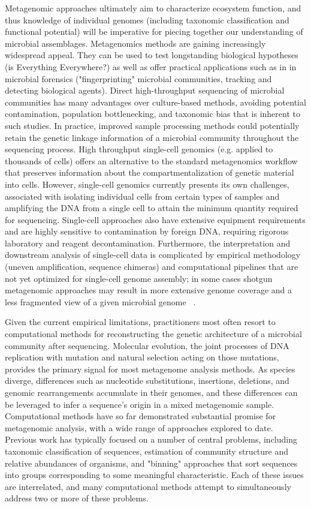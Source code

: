 \documentclass[10pt]{article}
\begin{document}
Metagenomic approaches ultimately aim to characterize ecosystem function, and thus knowledge of individual genomes (including taxonomic classification and functional potential) will be imperative for piecing together our understanding of microbial assemblages.
Metagenomics methods are gaining increasingly widespread appeal.
They can be used to test longstanding biological hypotheses (is Everything Everywhere?) as well as offer practical applications such as in in microbial forensics ("fingerprinting" microbial communities, tracking and detecting biological agents).
Direct high-throughput sequencing of microbial communities has many advantages over culture-based methods, avoiding potential contamination, population bottlenecking, and taxonomic bias that is inherent to such studies.
In practice, improved sample processing methods could potentially retain the genetic linkage information of a microbial community throughout the sequencing process.
High throughput single-cell genomics (e.g. applied to thousands of cells) offers an alternative to the standard metagenomics workflow that preserves information about the compartmentalization of genetic material into cells. 
However, single-cell genomics currently presents its own challenges, associated with isolating individual cells from certain types of samples and amplifying the {DNA} from a single cell to attain the minimum quantity required for sequencing. 
Single-cell approaches also have extensive equipment requirements and are highly sensitive to contamination by foreign DNA, requiring rigorous laboratory and reagent decontamination. 
Furthermore, the interpretation and downstream analysis of single-cell data is complicated by empirical methodology (uneven amplification, sequence chimeras) and computational pipelines that are not yet optimized for single-cell genome assembly; in some cases shotgun metagenomic approaches may result in more extensive genome coverage and a less fragmented view of a given microbial genome ~\cite{Stepanauskas2012}. 

Given the current empirical limitations, practitioners most often resort to computational methods for reconstructing the genetic architecture of a microbial community after sequencing. 
Molecular evolution, the joint processes of DNA replication with mutation and natural selection acting on those mutations, provides the primary signal for most metagenome analysis methods. 
As species diverge, differences such as nucleotide substitutions, insertions, deletions, and genomic rearrangements accumulate in their genomes, and these differences can be leveraged to infer a sequence's origin in a mixed metagenomic sample.
Computational methods have so far demonstrated substantial promise for metagenomic analysis, with a wide range of approaches explored to date. 
Previous work has typically focused on a number of central problems, including taxonomic classification of sequences, estimation of community structure and relative abundances of organisms, and "binning" approaches that sort sequences into groups corresponding to some meaningful characteristic. 
Each of these issues are interrelated, and many computational methods attempt to simultaneously address two or more of these problems.
\end{document}
